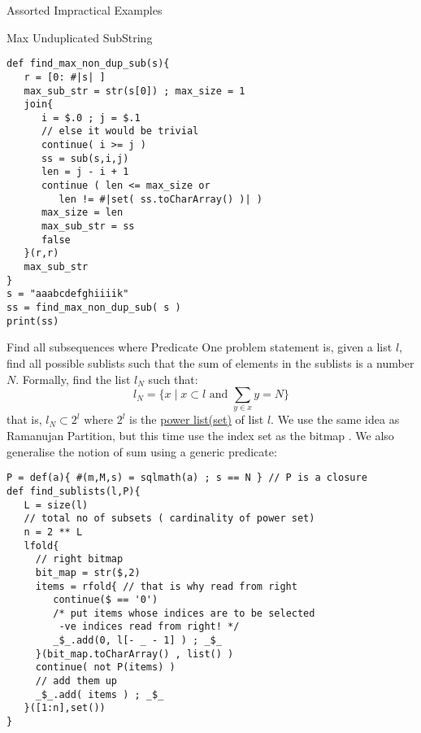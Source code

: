 \begin{section}{Assorted Impractical Examples}
\begin{subsection}{Max Unduplicated SubString}
\begin{center}\begin{minipage}{\linewidth}
\begin{lstlisting}[style=JexlStyle]
def find_max_non_dup_sub(s){
   r = [0: #|s| ] 
   max_sub_str = str(s[0]) ; max_size = 1  
   join{
      i = $.0 ; j = $.1 
      // else it would be trivial 
      continue( i >= j )
      ss = sub(s,i,j)
      len = j - i + 1
      continue ( len <= max_size or 
         len != #|set( ss.toCharArray() )| )
      max_size = len  
      max_sub_str = ss 
      false 
   }(r,r)
   max_sub_str 
}
s = "aaabcdefghiiiik"
ss = find_max_non_dup_sub( s )
print(ss)
\end{lstlisting}  
\end{minipage}\end{center} 

\end{subsection}

\begin{subsection}{Find all subsequences where Predicate }
One problem statement is, given a list $l$, find all possible sublists such that
the sum of elements in the sublists is a number $N$.
Formally, find the list $l_N$ such that:
$$
l_N = \{ x \; | \; x \subset l \text{ and } \sum_{y \in x } y = N \}
$$
that is, $l_N \subset 2^l$ where $2^l$ is the \href{https://en.wikipedia.org/wiki/Power\_set}{power list(set)} of list $l$.
We use the same idea as Ramanujan Partition, but this time use the index set as the bitmap .
We also generalise the notion of sum using a generic predicate:

\begin{center}\begin{minipage}{\linewidth}
\begin{lstlisting}[style=JexlStyle]
P = def(a){ #(m,M,s) = sqlmath(a) ; s == N } // P is a closure
def find_sublists(l,P){
   L = size(l) 
   // total no of subsets ( cardinality of power set)
   n = 2 ** L
   lfold{
     // right bitmap 
     bit_map = str($,2)
     items = rfold{ // that is why read from right
        continue($ == '0')  
        /* put items whose indices are to be selected 
         -ve indices read from right! */
        _$_.add(0, l[- _ - 1] ) ; _$_  
     }(bit_map.toCharArray() , list() )
     continue( not P(items) )
     // add them up 
     _$_.add( items ) ; _$_   
   }([1:n],set())   
}
\end{lstlisting}  
\end{minipage}\end{center} 


\end{subsection}
\end{section}
